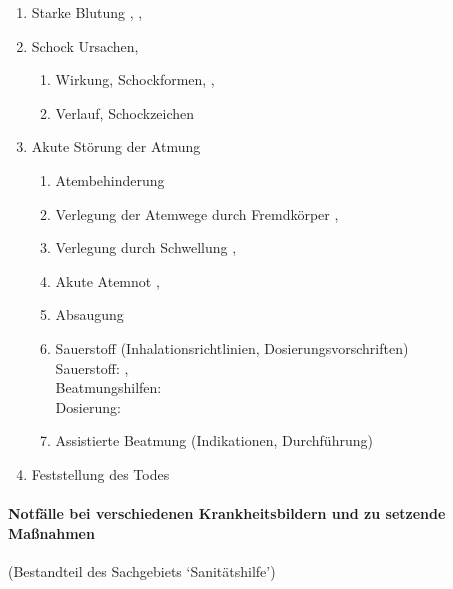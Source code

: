 \begin{enumerate}
\begin{enumerate}
      \item      Stoffwechsel \dotfill {}
    \end{enumerate}
    \item
    Starke Blutung \dotfill {},
    ,
    \item
    Schock Ursachen, \dotfill  {}
    \begin{enumerate}
      \item      Wirkung, Schockformen, \dotfill  {}, 
      \item      Verlauf, Schockzeichen \dotfill  {}
    \end{enumerate}
    \item Akute Störung der Atmung
    \begin{enumerate}
      \item      Atembehinderung \dotfill {}
      \item      Verlegung der Atemwege  durch Fremdkörper \dotfill {},
      \item      Verlegung durch Schwellung \dotfill {},
      \item      Akute Atemnot \dotfill {},
      \item      Absaugung \dotfill  {}
      \item      Sauerstoff (Inhalationsrichtlinien, Dosierungsvorschriften)
      \\
      Sauerstoff:  \dotfill {},\\
      Beatmungshilfen:  \dotfill {}\\
      Dosierung:  \dotfill {}
      \item      Assistierte Beatmung (Indikationen, Durchführung) \dotfill {}
    \end{enumerate}
    \item    Feststellung des Todes \dotfill {}
  \end{enumerate}
  

\paragraph{Notfälle bei verschiedenen Krankheitsbildern  und zu setzende Maßnahmen}
(Bestandteil des Sachgebiets \enquote*{Sanitätshilfe})
  
